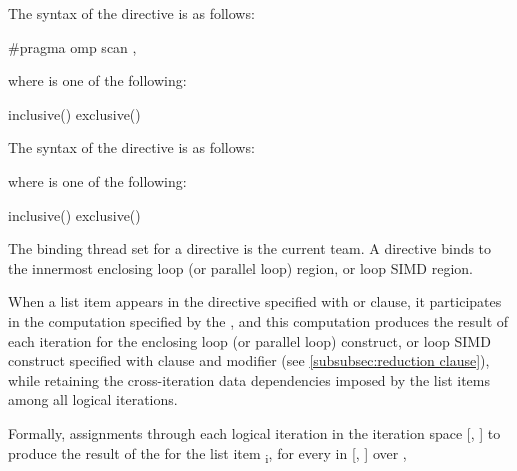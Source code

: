 \syntax
\begin{ccppspecific}
The syntax of the  directive is as follows:

\begin{ompcPragma}
#pragma omp scan \plc{clause[ [},\plc{] clause]} 
\end{ompcPragma}

where  is one of the following:
\begin{indentedcodelist}
inclusive()
exclusive()
\end{indentedcodelist}

\end{ccppspecific}

\begin{fortranspecific}
The syntax of the  directive is as follows:


where  is one of the following:
\begin{indentedcodelist}
inclusive()
exclusive()
\end{indentedcodelist}

\end{fortranspecific}

\binding
The binding thread set for a  directive is the current team. A 
 directive binds to the innermost enclosing loop (or parallel loop) 
region,  or loop SIMD region. 

\descr
When a list item appears in the  directive specified with  
or  clause, it participates in the  
computation specified by the , 
and this computation produces the result of each iteration for the enclosing loop (or parallel 
loop) construct,  or loop SIMD construct specified with  
clause and  modifier (see \ref{subsubsec:reduction clause}), while 
retaining the cross-iteration data dependencies imposed by the  list items among all logical iterations.

Formally, assignments through each logical iteration  in the iteration space [, ]  
to produce the result of the  for the list item 
\textsubscript{i}, for every  in [, ] over , 

